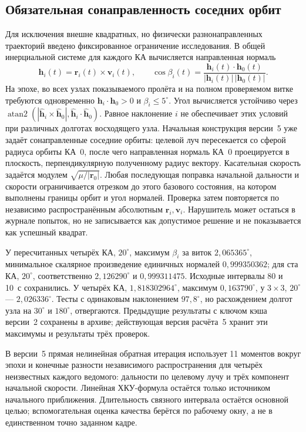 \documentclass[a4paper,12pt]{article}
\begin{document}
\subsection{Обязательная сонаправленность соседних орбит}

Для исключения внешне квадратных, но физически разнонаправленных
траекторий введено фиксированное ограничение исследования. В общей
инерциальной системе для каждого КА вычисляется направленная нормаль
\begin{equation}
 \mathbf h_i(t)=\mathbf r_i(t)\times\mathbf v_i(t),\qquad
 \cos\beta_i(t)=\frac{\mathbf h_i(t)\cdot\mathbf h_0(t)}
 {|\mathbf h_i(t)|\,|\mathbf h_0(t)|}.
\end{equation}
На эпохе, во всех узлах показываемого пролёта и на полном проверяемом
витке требуются одновременно $\mathbf h_i\cdot\mathbf h_0>0$ и
$\beta_i\leq5^\circ$. Угол вычисляется устойчиво через
$\operatorname{atan2}(|\widehat{\mathbf h}_i\times
\widehat{\mathbf h}_0|,\widehat{\mathbf h}_i\cdot
\widehat{\mathbf h}_0)$. Равное наклонение $i$ не обеспечивает
этих условий при различных долготах восходящего узла. Начальная
конструкция версии~5 уже задаёт сонаправленные соседние орбиты:
целевой луч пересекается со сферой радиуса орбиты КА~0, после чего
направленная нормаль КА~0 проецируется в плоскость, перпендикулярную
полученному радиус вектору. Касательная скорость задаётся модулем
$\sqrt{\mu/|\mathbf r_0|}$. Любая последующая поправка начальной
дальности и скорости ограничивается отрезком до этого базового
состояния, на котором выполнены границы орбит и угол нормалей.
Проверка затем повторяется
по независимо распространённым абсолютным $\mathbf r_i,\mathbf v_i$.
Нарушитель может остаться в журнале попыток, но не записывается как
допустимое решение и не показывается как успешный квадрат.

У пересчитанных четырёх КА, $20^\circ$, максимум $\beta_i$ за виток
$2{,}065365^\circ$, минимальное скалярное произведение единичных
нормалей $0{,}999350362$; для ста КА, $20^\circ$, соответственно
$2{,}126290^\circ$ и $0{,}999311475$. Исходные интервалы 80 и 10~с
сохранились. У четырёх КА, $1{,}818302964^\circ$, максимум
$0{,}163790^\circ$, у $3\times3$, $20^\circ$ ---
$2{,}026336^\circ$. Тесты с одинаковым наклонением
$97{,}8^\circ$, но расхождением долгот узла на $30^\circ$
и $180^\circ$, отвергаются. Предыдущие результаты с ключом
кэша версии~2 сохранены в архиве; действующая версия расчёта~5
хранит эти максимумы и результаты трёх проверок.

В версии~5 прямая нелинейная обратная итерация использует 11 моментов
вокруг эпохи и конечные разности независимого распространения
для четырёх неизвестных каждого ведомого: дальности по целевому лучу
и трёх компонент начальной скорости. Линейная ХКУ-формула остаётся
только источником начального приближения. Длительность связного
интервала остаётся основной целью; вспомогательная оценка качества
берётся по рабочему окну, а не в единственном точно заданном кадре.
\end{document}
